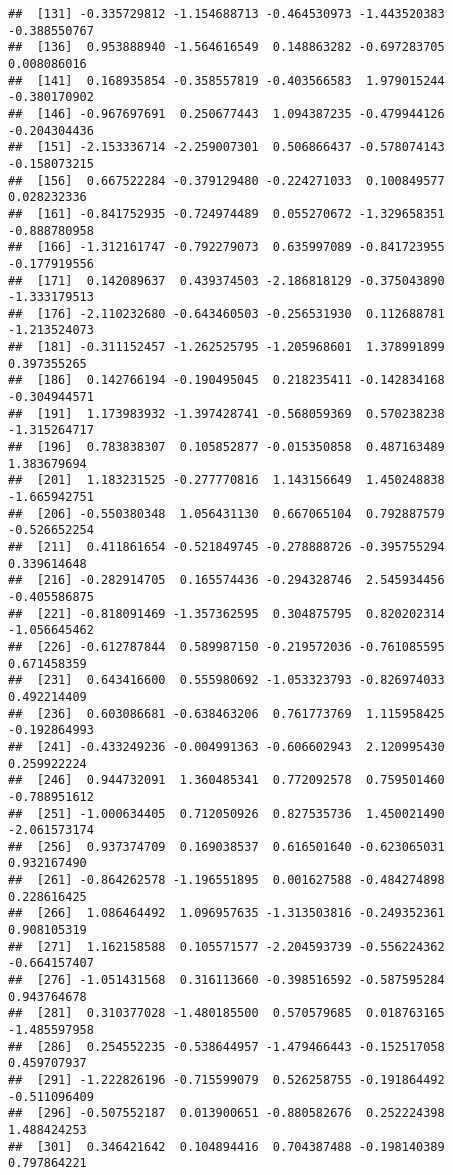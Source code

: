 \documentclass[
]{article}
\begin{document}
\begin{verbatim}
##  [131] -0.335729812 -1.154688713 -0.464530973 -1.443520383 -0.388550767
##  [136]  0.953888940 -1.564616549  0.148863282 -0.697283705  0.008086016
##  [141]  0.168935854 -0.358557819 -0.403566583  1.979015244 -0.380170902
##  [146] -0.967697691  0.250677443  1.094387235 -0.479944126 -0.204304436
##  [151] -2.153336714 -2.259007301  0.506866437 -0.578074143 -0.158073215
##  [156]  0.667522284 -0.379129480 -0.224271033  0.100849577  0.028232336
##  [161] -0.841752935 -0.724974489  0.055270672 -1.329658351 -0.888780958
##  [166] -1.312161747 -0.792279073  0.635997089 -0.841723955 -0.177919556
##  [171]  0.142089637  0.439374503 -2.186818129 -0.375043890 -1.333179513
##  [176] -2.110232680 -0.643460503 -0.256531930  0.112688781 -1.213524073
##  [181] -0.311152457 -1.262525795 -1.205968601  1.378991899  0.397355265
##  [186]  0.142766194 -0.190495045  0.218235411 -0.142834168 -0.304944571
##  [191]  1.173983932 -1.397428741 -0.568059369  0.570238238 -1.315264717
##  [196]  0.783838307  0.105852877 -0.015350858  0.487163489  1.383679694
##  [201]  1.183231525 -0.277770816  1.143156649  1.450248838 -1.665942751
##  [206] -0.550380348  1.056431130  0.667065104  0.792887579 -0.526652254
##  [211]  0.411861654 -0.521849745 -0.278888726 -0.395755294  0.339614648
##  [216] -0.282914705  0.165574436 -0.294328746  2.545934456 -0.405586875
##  [221] -0.818091469 -1.357362595  0.304875795  0.820202314 -1.056645462
##  [226] -0.612787844  0.589987150 -0.219572036 -0.761085595  0.671458359
##  [231]  0.643416600  0.555980692 -1.053323793 -0.826974033  0.492214409
##  [236]  0.603086681 -0.638463206  0.761773769  1.115958425 -0.192864993
##  [241] -0.433249236 -0.004991363 -0.606602943  2.120995430  0.259922224
##  [246]  0.944732091  1.360485341  0.772092578  0.759501460 -0.788951612
##  [251] -1.000634405  0.712050926  0.827535736  1.450021490 -2.061573174
##  [256]  0.937374709  0.169038537  0.616501640 -0.623065031  0.932167490
##  [261] -0.864262578 -1.196551895  0.001627588 -0.484274898  0.228616425
##  [266]  1.086464492  1.096957635 -1.313503816 -0.249352361  0.908105319
##  [271]  1.162158588  0.105571577 -2.204593739 -0.556224362 -0.664157407
##  [276] -1.051431568  0.316113660 -0.398516592 -0.587595284  0.943764678
##  [281]  0.310377028 -1.480185500  0.570579685  0.018763165 -1.485597958
##  [286]  0.254552235 -0.538644957 -1.479466443 -0.152517058  0.459707937
##  [291] -1.222826196 -0.715599079  0.526258755 -0.191864492 -0.511096409
##  [296] -0.507552187  0.013900651 -0.880582676  0.252224398  1.488424253
##  [301]  0.346421642  0.104894416  0.704387488 -0.198140389  0.797864221

\end{verbatim}
\end{document}
